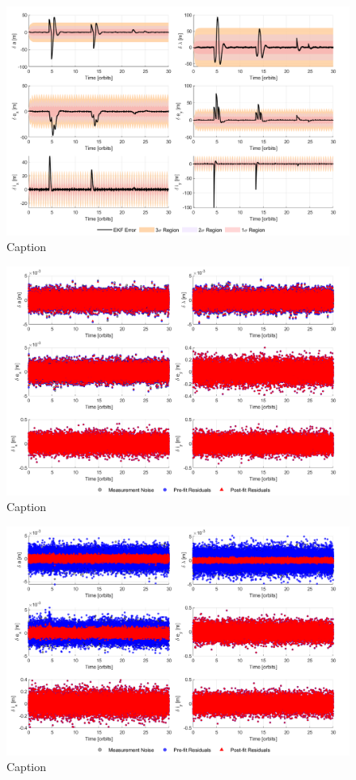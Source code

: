 \begin{figure}[H]
    \centering
    \includegraphics[width=0.7\linewidth]{sim/figures/PS9/EKF_error_SV3.png}
    \caption{Caption}
    \label{fig:enter-label}
\end{figure}

\begin{figure}[H]
    \centering
    \includegraphics[width=0.7\linewidth]{sim/figures/PS9/residuals_SV2.png}
    \caption{Caption}
    \label{fig:enter-label}
\end{figure}

\begin{figure}[H]
    \centering
    \includegraphics[width=0.7\linewidth]{sim/figures/PS9/residuals_SV3.png}
    \caption{Caption}
    \label{fig:enter-label}
\end{figure}




